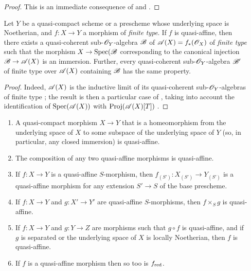 \begin{proof}
\label{proof-2.5.1.8}
This is an immediate consequence of  and .
\end{proof}

\begin{cor}[5.1.9]
\label{2.5.1.9}
Let $Y$ be a quasi-compact scheme or a prescheme whose underlying space is Noetherian, and $f:X\to Y$ a morphism of \emph{finite type}.
If $f$ is quasi-affine, then there exists a quasi-coherent sub-$\mathscr{O}_Y$-algebra $\mathscr{B}$ of $\mathscr{A}(X)=f_*(\mathscr{O}_X)$ of \emph{finite type}  such that the morphism $X\to\Spec(\sh{B}$ corresponding to the canonical injection $\sh{B}\to\sh{A}(X)$ is an immersion.
Further, every quasi-coherent sub-$\mathscr{O}_Y$-algebra $\mathscr{B}'$ of finite type over $\mathscr{A}(X)$ containing $\mathscr{B}$ has the same property.
\end{cor}

\begin{proof}
\label{proof-2.5.1.9}
Indeed, $\mathscr{A}(X)$ is the inductive limit of its quasi-coherent sub-$\mathscr{O}_Y$-algebras of finite type ;
the result is then a particular case of , taking into account the identification of ${\mathop{\mathrm{Spec}}\nolimits}(\mathscr{A}(X))$ with ${\mathop{\mathrm{Proj}}\nolimits}(\mathscr{A}(X)[T])$ .
\end{proof}

\begin{prop}[5.1.10]
\label{2.5.1.10}
\medskip\noindent
\begin{enumerate}[label=\emph{(\roman*)}]
    \item A quasi-compact morphism $X\to Y$ that is a homeomorphism from the underlying space of $X$ to some subspace of the underlying space of $Y$ (so, in particular, any closed immersion) is quasi-affine.
    \item The composition of any two quasi-affine morphisms is quasi-affine.
    \item If $f:X\to Y$ is a quasi-affine $S$-morphism, then $f_{(S')}:X_{(S')}\to Y_{(S')}$ is a quasi-affine morphism for any extension $S'\to S$ of the base prescheme.
    \item If $f:X\to Y$ and $g:X'\to Y'$ are quasi-affine $S$-morphisms, then $f\times_S g$ is quasi-affine.
    \item If $f:X\to Y$ and $g:Y\to Z$ are morphisms such that $g\circ f$ is quasi-affine, and if $g$ is separated or the underlying space of $X$ is locally Noetherian, then $f$ is quasi-affine.
    \item If $f$ is a quasi-affine morphism then so too is $f_{\mathrm{red}}$.
\end{enumerate}
\end{prop}

